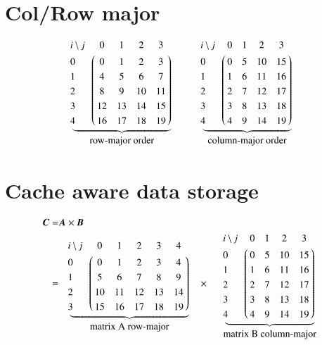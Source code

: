 \documentclass[10pt,a4paper]{article}%
\begin{document}
\section{Col/Row major}
\begin{align*}
\underbrace{\bordermatrix{
		i\ \text{\textbackslash} \ j
		& 0 &  1 & 2 & 3      \cr
		0 & 0  & 1  & 2  & 3  \cr
		1 & 4  & 5  & 6  & 7  \cr
		2 & 8  & 9  & 10 & 11 \cr
		3 & 12 & 13 & 14 & 15 \cr
		4 & 16 & 17 & 18 & 19 \cr
}}_{\textstyle\begin{array}{c}\text{row-major order}
\end{array}}
\qquad\quad
\underbrace{\bordermatrix{
		i\ \text{\textbackslash} \ j
		& 0 & 1 & 2 & 3     \cr
		0 & 0 & 5 & 10 & 15 \cr
		1 & 1 & 6 & 11 & 16 \cr
		2 & 2 & 7 & 12 & 17 \cr
		3 & 3 & 8 & 13 & 18 \cr
		4 & 4 & 9 & 14 & 19 \cr
}}_{\textstyle\begin{array}{c}\text{column-major order}
	\end{array}}
\end{align*}

\section{Cache aware data storage}
\begin{align*}
\boldsymbol{C}= &\boldsymbol{A} \times  \boldsymbol{B} \\
= & \quad\underbrace{\bordermatrix{
		i\ \text{\textbackslash} \ j
		& 0 &  1 &  2 &  3 & 4    \cr
		  0 &  0 &  1 &  2 & 3  & 4  \cr
		  1 &  5 &  6 &  7 & 8  & 9  \cr
		  2 & 10 & 11 & 12 & 13 & 14 \cr
		  3 & 15 & 16 & 17 & 18 & 19 \cr
}}_{\textstyle\begin{array}{c}\text{matrix A row-major}
	\end{array}}
\quad \times\quad
\underbrace{\bordermatrix{
		i\ \text{\textbackslash} \ j
		& 0 & 1 & 2 & 3     \cr
		0 & 0 & 5 & 10 & 15 \cr
		1 & 1 & 6 & 11 & 16 \cr
		2 & 2 & 7 & 12 & 17 \cr
		3 & 3 & 8 & 13 & 18 \cr
		4 & 4 & 9 & 14 & 19 \cr
}}_{\textstyle\begin{array}{c}\text{matrix B column-major}
	\end{array}}
\end{align*}
\end{document}
